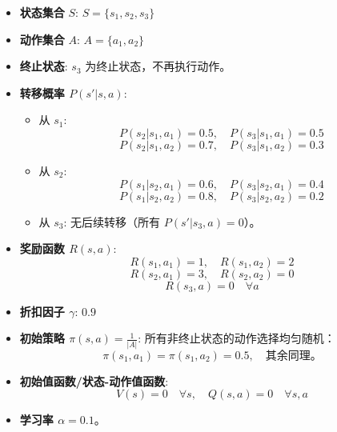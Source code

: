 \begin{itemize}
    \item \textbf{状态集合} \( S \): \( S = \{s_1, s_2, s_3\} \)
    \item \textbf{动作集合} \( A \): \( A = \{a_1, a_2\} \)
    \item \textbf{终止状态}: \( s_3 \) 为终止状态，不再执行动作。
    \item \textbf{转移概率 \( P(s'|s, a) \)}:
    \begin{itemize}
        \item 从 \( s_1 \):
        \[
        P(s_2|s_1, a_1) = 0.5, \quad P(s_3|s_1, a_1) = 0.5
        \]
        \[
        P(s_2|s_1, a_2) = 0.7, \quad P(s_3|s_1, a_2) = 0.3
        \]
        \item 从 \( s_2 \):
        \[
        P(s_1|s_2, a_1) = 0.6, \quad P(s_3|s_2, a_1) = 0.4
        \]
        \[
        P(s_1|s_2, a_2) = 0.8, \quad P(s_3|s_2, a_2) = 0.2
        \]
        \item 从 \( s_3 \): 无后续转移（所有 \( P(s'|s_3, a) = 0 \)）。
    \end{itemize}
    \item \textbf{奖励函数 \( R(s, a) \)}:
    \[
    R(s_1, a_1) = 1, \quad R(s_1, a_2) = 2
    \]
    \[
    R(s_2, a_1) = 3, \quad R(s_2, a_2) = 0
    \]
    \[
    R(s_3, a) = 0 \quad \forall a
    \]
    \item \textbf{折扣因子 \( \gamma \)}: \( 0.9 \)
    \item \textbf{初始策略 \( \pi(s, a) = \frac{1}{|A|} \)}:
    所有非终止状态的动作选择均匀随机：
    \[
    \pi(s_1, a_1) = \pi(s_1, a_2) = 0.5, \quad \text{其余同理。}
    \]
    \item \textbf{初始值函数/状态-动作值函数}:
    \[
    V(s) = 0 \quad \forall s, \quad Q(s, a) = 0 \quad \forall s, a
    \]
    \item \textbf{学习率 \( \alpha = 0.1 \)}。
\end{itemize}

\newpage